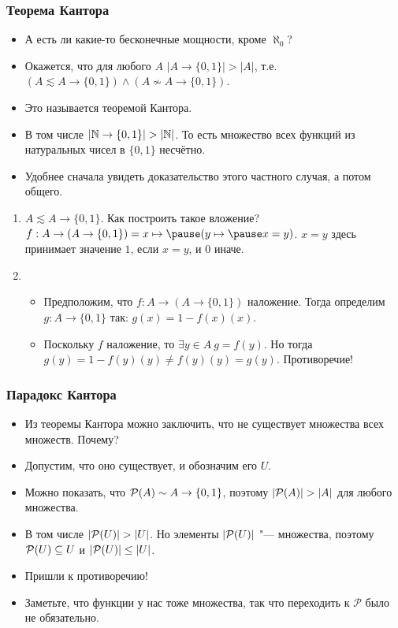 \documentclass[10pt]{beamer}
\begin{document}
\begin{frame}
    \frametitle{Теорема Кантора}
    \begin{itemize}
        \item А есть ли какие-то бесконечные мощности, кроме $\aleph_0$?
        \pause
        \item Окажется, что для любого $A$ $|A \to \{0,1\}| > |A|$, т.е. $(A \lesssim A \to \{0,1\}) \land (A \nsim A \to \{0,1\})$.
        \item Это называется теоремой Кантора.
        \pause
        \item В том числе $|\mathbb{N} \to \{0,1\}| > |\mathbb{N}|$. То есть множество всех функций из натуральных чисел в $\{0,1\}$ несчётно.
        \item Удобнее сначала увидеть доказательство этого частного случая, а потом общего.
    \end{itemize}
    \begin{enumerate}
        \pause
        \item $A \lesssim A \to \{0,1\}$. Как построить такое вложение? $f: A \to (A \to \{0,1\}) = x \mapsto \pause (y \mapsto \pause x = y)$. $x=y$ здесь принимает значение \pause $1$, если $x=y$, и $0$ иначе.
        \item 
        \begin{itemize}
            \item Предположим, что $f: A \to (A \to \{0,1\})$ наложение. Тогда определим $g: A \to \{0,1\}$ так: $g(x) = 1 - f(x)(x)$.
            \item Поскольку $f$ наложение, то $\exists y \in A~g = f(y)$. Но тогда \pause $g(y) = 1 - f(y)(y) \neq f(y)(y) = g(y)$. Противоречие!
        \end{itemize}
    \end{enumerate}
\end{frame}

\begin{frame}
    \frametitle{Парадокс Кантора}
    \begin{itemize}
        \item Из теоремы Кантора можно заключить, что не существует множества всех множеств. Почему?
        \pause
        \item Допустим, что оно существует, и обозначим его $U$.
        \item Можно показать, что $\mathcal{P}({A}) \sim A \to \{0,1\}$, поэтому $|\mathcal{P}({A})| > |A|$ для любого множества.
        \item В том числе $|\mathcal{P}({U})| > |U|$. Но элементы $|\mathcal{P}({U})|$ "--- множества, поэтому \pause $\mathcal{P}({U}) \subseteq U$ и \pause $|\mathcal{P}({U})| \leq |U|$.
        \item Пришли к противоречию!
        \pause
        \item Заметьте, что функции у нас тоже множества, так что переходить к $\mathcal{P}$ было не обязательно.
    \end{itemize}
\end{frame}
\end{document}
